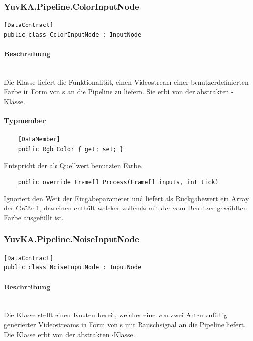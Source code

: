 \subsubsection{YuvKA.Pipeline.ColorInputNode}

\begin{verbatim}
[DataContract]
public class ColorInputNode : InputNode
\end{verbatim}

\paragraph{Beschreibung}~\\
Die Klasse  liefert die Funktionalität, einen Videostream einer benutzerdefinierten Farbe in Form von s an die Pipeline zu liefern. Sie erbt von der abstrakten -Klasse.

\paragraph{Typmember}
\begin{itemize}

	\begin{verbatim}
	[DataMember]
	public Rgb Color { get; set; }
	\end{verbatim}
	Entspricht der als Quellwert benutzten Farbe.


	\begin{verbatim}
	public override Frame[] Process(Frame[] inputs, int tick)
	\end{verbatim}
	Ignoriert den Wert der Eingabeparameter und liefert als Rückgabewert ein Array der Größe 1, das einen  enthält welcher vollends mit der vom Benutzer gewählten Farbe ausgefüllt ist.

\end{itemize}

\subsubsection{YuvKA.Pipeline.NoiseInputNode}

\begin{verbatim}
[DataContract]
public class NoiseInputNode : InputNode
\end{verbatim}

\paragraph{Beschreibung}~\\
Die Klasse  stellt einen Knoten bereit, welcher eine von zwei Arten zufällig generierter Videostreams in Form von s mit Rauschsignal an die Pipeline liefert. Die Klasse erbt von der abstrakten -Klasse.

